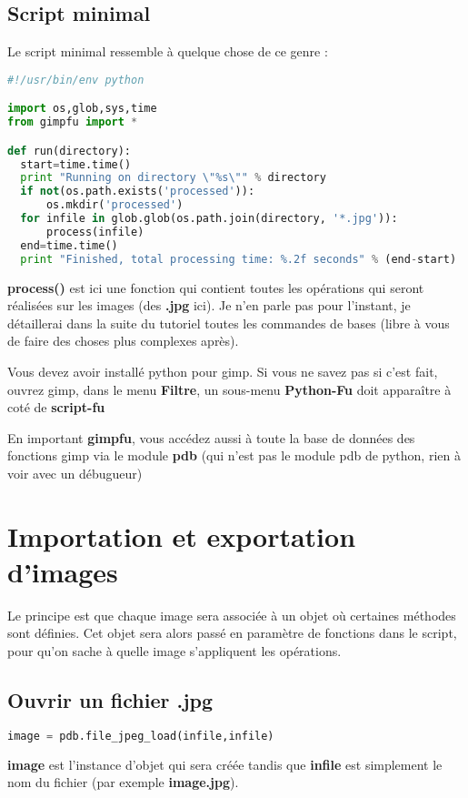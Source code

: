 \documentclass[a4paper,twoside]{article}
\begin{document}
\subsection{Script minimal}
Le script minimal ressemble à quelque chose de ce genre : 
\begin{lstlisting}[language=Python]
#!/usr/bin/env python

import os,glob,sys,time
from gimpfu import *

def run(directory):
  start=time.time()
  print "Running on directory \"%s\"" % directory
  if not(os.path.exists('processed')):
	  os.mkdir('processed')
  for infile in glob.glob(os.path.join(directory, '*.jpg')):
	  process(infile)
  end=time.time()
  print "Finished, total processing time: %.2f seconds" % (end-start)
\end{lstlisting}
\textbf{process()} est ici une fonction qui contient toutes les opérations qui seront réalisées sur les images (des \textbf{.jpg} ici). Je n'en parle pas pour l'instant, je détaillerai dans la suite du tutoriel toutes les commandes de bases (libre à vous de faire des choses plus complexes après).

\begin{important}
Vous devez avoir installé python pour gimp. Si vous ne savez pas si c'est fait, ouvrez gimp, dans le menu \textbf{Filtre}, un sous-menu \textbf{Python-Fu} doit apparaître à coté de \textbf{script-fu}
\end{important}


En important \textbf{gimpfu}, vous accédez aussi à toute la base de données des fonctions gimp via le module \textbf{pdb} (qui n'est pas le module pdb de python, rien à voir avec un débugueur)

\section{Importation et exportation d'images}
Le principe est que chaque image sera associée à un objet où certaines méthodes sont définies. Cet objet sera alors passé en paramètre de fonctions dans le script, pour qu'on sache à quelle image s'appliquent les opérations.

\subsection{Ouvrir un fichier .jpg}
\begin{lstlisting}[language=Python]
image = pdb.file_jpeg_load(infile,infile)
\end{lstlisting}
\textbf{image} est l'instance d'objet qui sera créée tandis que \textbf{infile} est simplement le nom du fichier (par exemple \textbf{image.jpg}).
\end{document}
